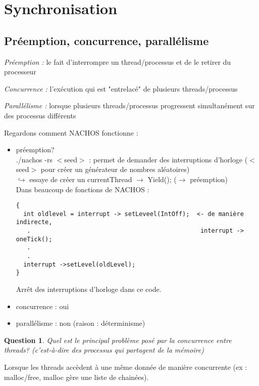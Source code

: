 \documentclass[12pt,a4paper]{report}
\newtheorem*{q}{Question}
\begin{document}
\section{Synchronisation}
\subsection{Préemption, concurrence, parallélisme}
\begin{description}
\item \textit{Préemption :} le fait d'interrompre un thread/processus et de le retirer du processeur
\item \textit{Concurrence :} l'exécution qui est "entrelacé" de plusieurs threads/processus
\item \textit{Parallélisme :} lorsque plusieurs threads/processus progressent simultanément sur des processus différents\\
\end{description}

Regardons comment NACHOS fonctionne :
\begin{itemize}
\item préemption? \\
./nachos -rs $<$seed$>$ : permet de demander des interruptions d'horloge ($<$seed$>$ pour créer un générateur de nombres aléatoires)\\
$\hookrightarrow$ essaye de créer un currentThread $\rightarrow$ Yield(); ($\rightarrow$ préemption)\\

Dans beaucoup de fonctions de NACHOS :
\medskip
\begin{verbatim}
{ 
  int oldlevel = interrupt -> setLeveel(IntOff);  <- de manière indirecte, 
   .                                               interrupt -> oneTick();
   .
   .
  interrupt ->setLevel(oldLevel);
}
\end{verbatim}
\medskip
Arrêt des interruptions d'horloge dans ce code. \\


\item concurrence : oui
\item parallélisme : non (raison : déterminisme)\\
\end{itemize}

\begin{q} Quel est le principal problème posé par la concurrence entre threads? (c'est-à-dire des processus qui partagent de la mémoire)\end{q}
Lorsque les threads accèdent à une même donnée de manière concurrente (ex : malloc/free, malloc gère une liste de chainées).\\
\end{document}
